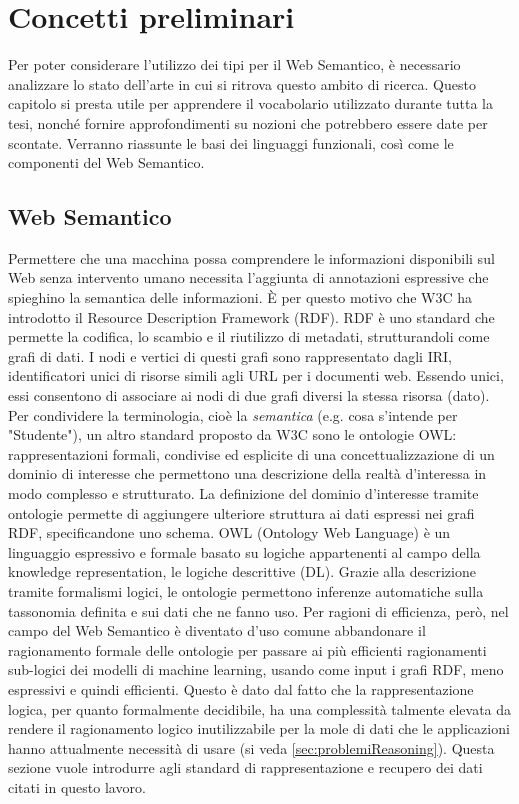\chapter[Concetti preliminari]{Concetti preliminari}\label{chap:preliminaries}
Per poter considerare l'utilizzo dei tipi per il Web Semantico, è necessario analizzare lo stato dell'arte in cui si ritrova questo ambito di ricerca.
Questo capitolo si presta utile per apprendere il vocabolario utilizzato durante tutta la tesi, nonché fornire approfondimenti su nozioni che potrebbero essere date per scontate.
Verranno riassunte le basi dei linguaggi funzionali, così come le componenti del Web Semantico.

\section[Web Semantico]{Web Semantico}
Permettere che una macchina possa comprendere le informazioni disponibili sul Web senza intervento umano \cite{berners2001semantic} necessita l'aggiunta di annotazioni espressive che spieghino la semantica delle informazioni. È per questo motivo che W3C ha introdotto il Resource Description Framework (RDF). RDF è uno standard che permette la codifica, lo scambio e il riutilizzo di metadati, strutturandoli come grafi di dati. I nodi e vertici di questi grafi sono rappresentato dagli IRI, identificatori unici di risorse simili agli URL per i documenti web. Essendo unici, essi consentono di associare ai nodi di due grafi diversi la stessa risorsa (dato). Per condividere la terminologia, cioè la \textit{semantica} (e.g. cosa s'intende per "Studente"), un altro standard proposto da W3C sono le ontologie OWL: rappresentazioni formali, condivise ed esplicite di una concettualizzazione di un dominio di interesse \cite{goy2015ontologies} che permettono una descrizione della realtà d'interessa in modo complesso e strutturato. La definizione del dominio d'interesse tramite ontologie permette di aggiungere ulteriore struttura ai dati espressi nei grafi RDF, specificandone uno schema. OWL (Ontology Web Language) è un linguaggio espressivo e formale basato su logiche appartenenti al campo della knowledge representation, le logiche descrittive (DL). Grazie alla descrizione tramite formalismi logici, le ontologie permettono inferenze automatiche sulla tassonomia definita e sui dati che ne fanno uso. Per ragioni di efficienza, però, nel campo del Web Semantico è diventato d'uso comune abbandonare il ragionamento formale delle ontologie per passare ai più efficienti ragionamenti sub-logici dei modelli di machine learning, usando come input i grafi RDF, meno espressivi e quindi efficienti. Questo è dato dal fatto che la rappresentazione logica, per quanto formalmente decidibile, ha una complessità talmente elevata da rendere il ragionamento logico inutilizzabile per la mole di dati che le applicazioni hanno attualmente necessità di usare (si veda \autoref{sec:problemiReasoning}). Questa sezione vuole introdurre agli standard di rappresentazione e recupero dei dati citati in questo lavoro.

